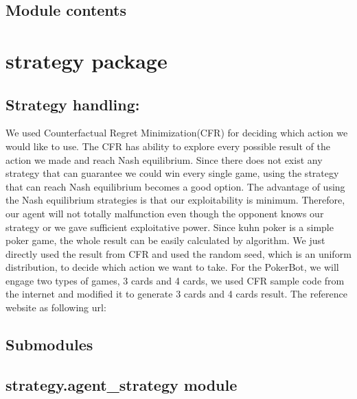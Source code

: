 \documentclass[letterpaper,10pt,english]{sphinxmanual}
\begin{document}
\section{Module contents}
\label{\detokenize{models:module-models}}\label{\detokenize{models:module-contents}}
\sphinxstepscope


\chapter{strategy package}
\label{\detokenize{strategy:strategy-package}}\label{\detokenize{strategy::doc}}

\section{Strategy handling:}
\label{\detokenize{strategy:strategy-handling}}
\sphinxAtStartPar
We used Counterfactual Regret Minimization(CFR) for deciding which action we would like to use. The CFR has ability to explore every possible result of the action we made and reach Nash equilibrium. Since there does not exist any strategy that can guarantee we could win every single game, using the strategy that can reach Nash equilibrium becomes a good option. The advantage of using the Nash equilibrium strategies is that our exploitability is minimum. Therefore, our agent will not totally malfunction even though the opponent knows our strategy or we gave sufficient exploitative power. Since kuhn poker is a simple poker game, the whole result can be easily calculated by algorithm. We just directly used the result from CFR and used the random seed, which is an uniform distribution, to decide which action we want to take. For the PokerBot, we will engage two types of games, 3 cards and 4 cards, we used CFR sample code from the internet and modified it to generate 3 cards and 4 cards result. The reference website as following url: 


\section{Submodules}
\label{\detokenize{strategy:submodules}}

\section{strategy.agent\_strategy module}
\label{\detokenize{strategy:module-strategy.agent_strategy}}\label{\detokenize{strategy:strategy-agent-strategy-module}}
\end{document}
